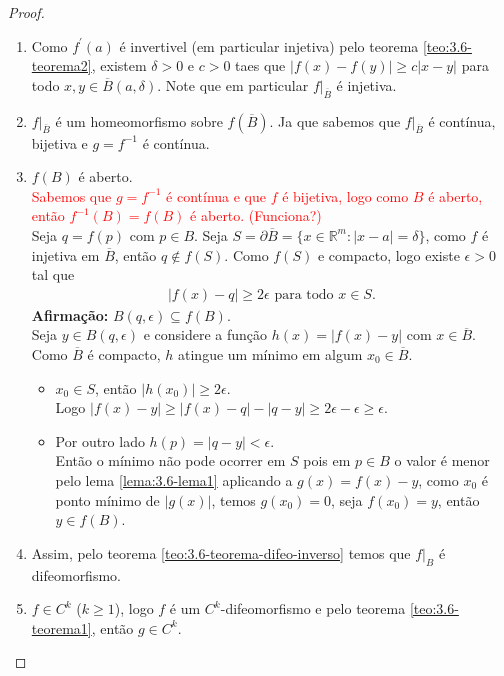 \begin{proof} 
  \begin{enumerate}
    \item Como $f^{\prime}(a)$ é invertivel (em particular injetiva) pelo teorema \ref{teo:3.6-teorema2}, existem $\delta>0$ e $c>0$ taes que $|f(x)-f(y)|\geq c|x-y|$ para todo $x,y\in \overline{B}(a,\delta)$. Note que em particular $f\big|_{\overline{B}}$ é injetiva.
    \item $f\big|_{\overline{B}}$ é um homeomorfismo sobre $f\left( \overline{B} \right)$. Ja que sabemos que $f\big|_{\overline{B}}$ é contínua, bijetiva e $g=f^{-1}$ é contínua.
    \item $f(B)$ é aberto.\\
      \textcolor{red}{Sabemos que $g=f^{-1}$ é contínua e que $f$ é bijetiva, logo como $B$ é aberto, então $f^{-1}\left( B \right)=f(B)$ é aberto. (Funciona?)}\\
      Seja $q=f(p)$ com $p\in B$. Seja $S=\partial\overline{B}=\{x\in\mathbb{R}^{m}:|x-a|=\delta\}$, como $f$ é injetiva em $\overline{B}$, então $q\notin f(S)$. Como $f(S)$ e compacto, logo existe $\epsilon>0$ tal que
      \begin{align*}
        |f(x)-q|\geq 2\epsilon\text{ para todo }x\in S.
      \end{align*}
      \textbf{Afirmação:} $B(q,\epsilon)\subseteq f(B)$.\\
      Seja $y\in B(q,\epsilon)$ e considere a função $h(x)=|f(x)-y|$ com $x\in \overline{B}$. Como $\overline{B}$ é compacto, $h$ atingue um mínimo em algum $x_0\in \overline{B}$.
      \begin{itemize}
        \item $x_0\in S$, então $|h(x_0)|\geq 2\epsilon$.\\
          Logo $|f(x)-y|\geq |f(x)-q|-|q-y|\geq 2\epsilon-\epsilon\geq \epsilon.$
        \item Por outro lado $h(p)=|q-y|<\epsilon$.\\
          Então o mínimo não pode ocorrer em $S$ pois em $p\in B$ o valor é menor pelo lema \ref{lema:3.6-lema1} aplicando a $g(x)=f(x)-y$, como $x_0$ é ponto mínimo de $|g(x)|$, temos $g(x_0)=0$, seja $f(x_0)=y$, então $y\in f(B)$. 
      \end{itemize}
    \item Assim, pelo teorema \ref{teo:3.6-teorema-difeo-inverso} temos que $f\big|_{B}$ é difeomorfismo.
    \item $f\in C^{k}$ ($k\geq 1$), logo $f$ é um $C^{k}$-difeomorfismo e pelo teorema \ref{teo:3.6-teorema1}, então $g\in C^{k}$.
  \end{enumerate}
\end{proof}
